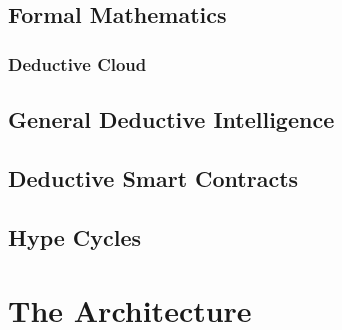 \subsection{Formal Mathematics}\label{formal-mathematics}

\subsubsection{Deductive Cloud}\label{deductive-cloud}

\subsection{General Deductive Intelligence}\label{general-deductive-intelligence}

\subsection{Deductive Smart Contracts}\label{deductive-smart-contracts}

\subsection{Hype Cycles}\label{hype-cycles}

\section{The Architecture}\label{the-architecture}


\backmatter




\clearpage
\listoftables

\clearpage
\listofposition
{}

\twocolumn[
]
{\small\printindex}

\vfil



